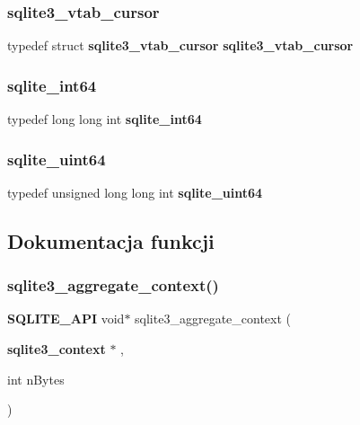 \subsubsection{sqlite3\_vtab\_cursor}
{\footnotesize\ttfamily typedef struct \textbf{ sqlite3\+\_\+vtab\+\_\+cursor} \textbf{ sqlite3\+\_\+vtab\+\_\+cursor}}

\mbox{\label{sqlite3_8h_a520a95f9080c018b2fade39885bd2e2a}} 
\subsubsection{sqlite\_int64}
{\footnotesize\ttfamily typedef long long int \textbf{ sqlite\+\_\+int64}}

\mbox{\label{sqlite3_8h_a127a9c18f6d067a05b994f5d0111ee25}} 
\subsubsection{sqlite\_uint64}
{\footnotesize\ttfamily typedef unsigned long long int \textbf{ sqlite\+\_\+uint64}}



\subsection{Dokumentacja funkcji}
\mbox{\label{sqlite3_8h_aa4b8b7e57758c004b4e9ec14489bde1c}} 
\subsubsection{sqlite3\_aggregate\_context()}
{\footnotesize\ttfamily \textbf{ S\+Q\+L\+I\+T\+E\+\_\+\+A\+PI} void$\ast$ sqlite3\+\_\+aggregate\+\_\+context (\begin{DoxyParamCaption}\item[{\textbf{ sqlite3\+\_\+context} $\ast$}]{,  }\item[{int}]{n\+Bytes }\end{DoxyParamCaption})}

\mbox{\label{sqlite3_8h_ac67daf84dba1b9d2a5343c2a64992df1}} 
